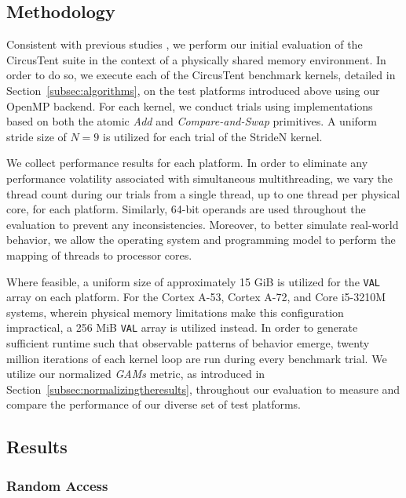\subsection{Methodology}
\label{subsec:methodology}

Consistent with previous studies \cite{villa2008barriers}\cite{david2013sync}\cite{schweizer2015evaluating}\cite{hoseini2019modeling}, we perform our initial evaluation of the CircusTent suite in the context of a physically shared memory environment.
In order to do so, we execute each of the CircusTent benchmark kernels, detailed in Section~\ref{subsec:algorithms}, on the test platforms introduced above using our OpenMP backend.
For each kernel, we conduct trials using implementations based on both the atomic \textit{Add} and \textit{Compare-and-Swap} primitives.
A uniform stride size of $N=9$ is utilized for each trial of the StrideN kernel.

We collect performance results for each platform.
In order to eliminate any performance volatility associated with simultaneous multithreading, we vary the thread count during our trials from a single thread, up to one thread per physical core, for each platform.
Similarly, 64-bit operands are used throughout the evaluation to prevent any inconsistencies.
Moreover, to better simulate real-world behavior, we allow the operating system and programming model to perform the mapping of threads to processor cores.

Where feasible, a uniform size of approximately 15 GiB is utilized for the \texttt{VAL} array on each platform.
For the Cortex A-53, Cortex A-72, and Core i5-3210M systems, wherein physical memory limitations make this configuration impractical, a 256 MiB \texttt{VAL} array is utilized instead.
In order to generate sufficient runtime such that observable patterns of behavior emerge, twenty million iterations of each kernel loop are run during every benchmark trial.
We utilize our normalized \textit{GAMs} metric, as introduced in Section~\ref{subsec:normalizingtheresults}, throughout our evaluation to measure and compare the performance of our diverse set of test platforms.

\subsection{Results}
\label{subsec:results}

\subsubsection{Random Access}
\label{subsubsec:random_access_res}

